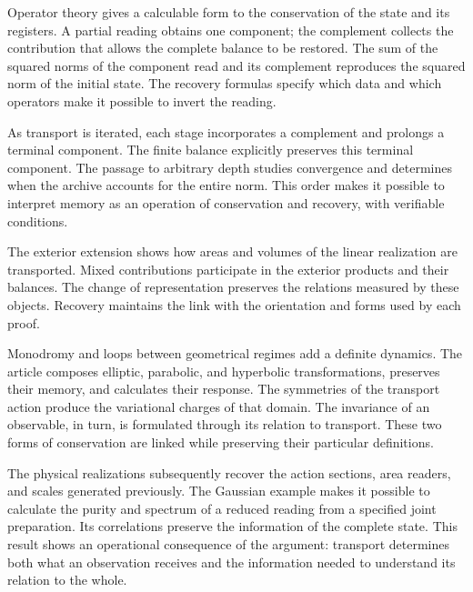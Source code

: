 
Operator theory gives a calculable form to the conservation of the state
and its registers. A partial reading obtains one component; the
complement collects the contribution that allows the complete balance
to be restored. The sum of the squared norms of the component read and
its complement reproduces the squared norm of the initial state. The
recovery formulas specify which data and which operators make it
possible to invert the reading.

As transport is iterated, each stage incorporates a complement and
prolongs a terminal component. The finite balance explicitly preserves
this terminal component. The passage to arbitrary depth studies
convergence and determines when the archive accounts for the entire
norm. This order makes it possible to interpret memory as an operation
of conservation and recovery, with verifiable conditions.

The exterior extension shows how areas and volumes of the linear
realization are transported. Mixed contributions participate in the
exterior products and their balances. The change of representation
preserves the relations measured by these objects. Recovery maintains
the link with the orientation and forms used by each proof.

Monodromy and loops between geometrical regimes add a definite
dynamics. The article composes elliptic, parabolic, and hyperbolic
transformations, preserves their memory, and calculates their response.
The symmetries of the transport action produce the variational charges
of that domain. The invariance of an observable, in turn, is formulated
through its relation to transport. These two forms of conservation are
linked while preserving their particular definitions.

The physical realizations subsequently recover the action sections,
area readers, and scales generated previously. The Gaussian example
makes it possible to calculate the purity and spectrum of a reduced
reading from a specified joint preparation. Its correlations preserve
the information of the complete state. This result shows an operational
consequence of the argument: transport determines both what an
observation receives and the information needed to understand its
relation to the whole.
